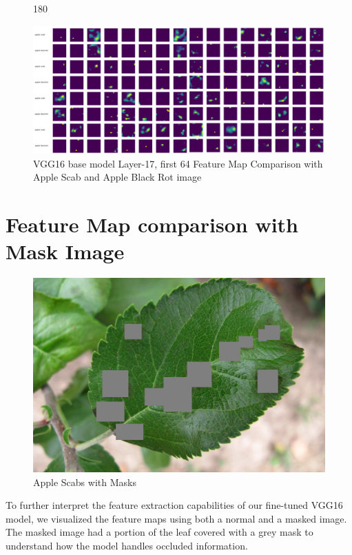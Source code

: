 \begin{figure}
    \centering
    \begin{turn}{180}
        \begin{minipage}{\linewidth}
        \centering
        \includegraphics[width=1\linewidth]{graphics//chapter7/fmap comp abr as l17.png}
        \caption{VGG16 base model Layer-17, first 64 Feature Map Comparison with Apple Scab and Apple Black Rot image}
        \label{fig:comp-5}
        \end{minipage}
    \end{turn}
\end{figure}


\section{Feature Map comparison with Mask Image}
\begin{figure}
    \centering
    \includegraphics[width=0.5\linewidth]{graphics//chapter7/apple scab mask.png}
    \caption{Apple Scabs with Masks}
    \label{fig:apple-scab-mask}
\end{figure}

To further interpret the feature extraction capabilities of our fine-tuned VGG16 model, we visualized the feature maps using both a normal and a masked image. The masked image had a portion of the leaf covered with a grey mask to understand how the model handles occluded information.\par\vspace{1em}

